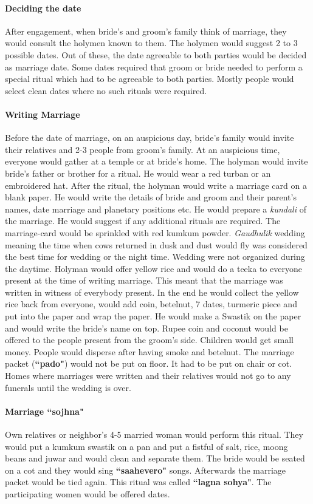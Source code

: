 \paragraph{Deciding the date} After engagement, when bride's and groom's family
think of marriage, they would consult the holymen known to them. The holymen
would suggest 2 to 3 possible dates. Out of these, the date agreeable to both
parties would be decided as marriage date. Some dates required that groom or
bride needed to perform a special ritual which had to be agreeable to both
parties. Mostly people would select clean dates where no such rituals were
required. 

\paragraph{Writing Marriage} Before the date of marriage, on an auspicious day,
bride's family would invite their relatives and 2-3 people from groom's family.
At an auspicious time, everyone would gather at a temple or at bride's home.
The holyman would invite bride's father or brother for a ritual. He would wear a
red turban or an embroidered hat. After the ritual, the holyman would write a
marriage card on a blank paper. He would write the details of bride and groom
and their parent's names, date marriage and planetary positions etc. He would
prepare a \textit{kundali} of the marriage. He would suggest if any additional
rituals are required. The marriage-card would be sprinkled with red kumkum
powder. \textit{Gaudhulik} wedding meaning the time when cows returned in dusk
and dust would fly was considered the best time for wedding or the night time.
Wedding were not organized during the daytime. Holyman would offer yellow rice
and would do a teeka to everyone present at the time of writing marriage. This
meant that the marriage was written in witness of everybody present. In the end
he would collect the yellow rice back from everyone, would add coin, betelnut,
7 dates, turmeric piece and put into the paper and wrap the paper. He would
make a Swastik on the paper and would write the bride's name on top. Rupee coin
and coconut would be offered to the people present from the groom's side.
Children would get small money. People would disperse after having smoke and
betelnut. The marriage packet (\textbf{``pado"}) would not be put on floor. It
had to be put on chair or cot. Homes where marriages were written and their
relatives would not go to any funerals until the wedding is over.

\paragraph{Marriage ``sojhna"} Own relatives or neighbor's 4-5 married woman
would perform this ritual. They would put a kumkum swastik on a pan and put a
fistful of salt, rice, moong beans and juwar and would clean and separate them.
The bride would be seated on a cot and they would sing \textbf{``saahevero"}
songs. Afterwards the marriage packet would be tied again. This ritual was
called \textbf{``lagna sohya"}. The participating women would be offered dates.

